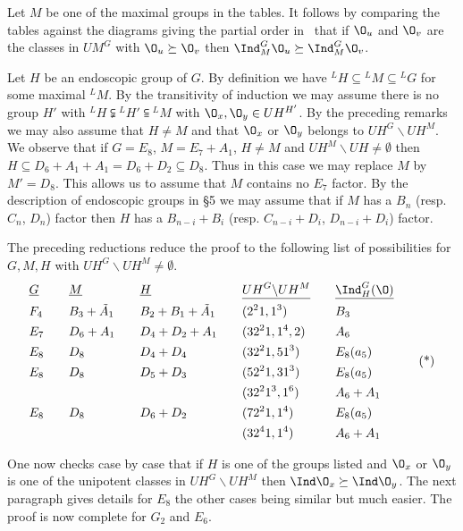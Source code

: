  Let $M$ be one of the maximal groups in the tables. 
It follows
by comparing the tables against the diagrams giving the partial
order 
in~\cite{Sp} that if $\O_u$ and $\O_v$ are the classes in $UM^G$
with
$\O_u \succeq \O_v$ then $\Ind_M^G \O_u \succeq \Ind_M^G \O_v$.

Let $H$ be an endoscopic group of $G$.  By definition we have
${}^L H \subseteq {}^L M \subseteq {}^L G$ for some maximal ${}^L
M$.  By
the transitivity of induction we may assume there is no group
$H'$ with
${}^L H \subsetneqq {}^L H' \subseteqq {}^L M$ with $\O_x, \O_y
\in UH^{H'}$.
By the preceding remarks we may also assume that $H \ne M$ and
that
$\O_x$ or $\O_y$ belongs to $UH^G \backslash UH^M$.  We observe
that if
$G = E_8$, $M = E_7 + A_1$, $H \ne M$ and $UH^M \backslash UH \ne
\emptyset$
then $H \subseteq D_6 + A_1 + A_1 = D_6 + D_2 \subseteq D_8$. 
Thus in this
case we may replace $M$ by $M' = D_8$.  This allows us to assume
that $M$
contains no $E_7$ factor.  By the description of endoscopic
groups in \S 5
we may assume that if $M$ has a $B_n$ (resp. $C_n$, $D_n$) factor
then $H$
has a $B_{n-i} + B_i$ (resp. $C_{n-i} + D_i$, $D_{n-i} + D_i$)
factor.

The preceding reductions reduce the proof to the following list
of
possibilities for $G, M, H$ with $UH^G \backslash UH^M \ne
\emptyset$.
     $$
     \alignedat 5
     &\underline{G} &\qquad &\underline{M} &\qquad
          &\underline{H} &\qquad &\underline{UH^G \backslash
UH^M} 
          &\qquad &\underline{\Ind_H^G (\O)}\\
     &F_4 &\qquad &B_3 + \tilde A_1 &\qquad &B_2 + B_1 + \tilde
A_1 
          &\qquad &(2^21, 1^3) &\qquad &B_3 \\
     &E_7 &\qquad &D_6 + A_1 &\qquad &D_4 + D_2 + A_1 &\qquad
&(32^21,1^4,2)
          &\qquad &A_6 \\
     &E_8 &\qquad &D_8 &\qquad &D_4 + D_4 &\qquad &(32^21,51^3)
          &\qquad &E_8(a_5) \\
     &E_8 &\qquad &D_8 &\qquad &D_5 + D_3 &\qquad &(52^21,31^3)
          &\qquad &E_8(a_5) \\
     &&&&&&&(32^21^3,1^6) &\qquad &A_6 + A_1 \\
     &E_8 &\qquad &D_8 &\qquad &D_6 + D_2 &\qquad &(72^21,1^4)
          &\qquad &E_8(a_5) \\
     &&&&&&&(32^41,1^4) &\qquad &A_6 + A_1
     \endalignedat
     \tag *
     $$

One now checks case by case that if $H$ is one of the groups
listed and
$\O_x$ or $\O_y$ is one of the unipotent classes in $UH^G
\backslash UH^M$
then $\Ind \O_x \succeq \Ind \O_y$.  The next paragraph gives
details for
$E_8$ the other cases being similar but much easier.  The proof
is now
complete for $G_2$ and $E_6$.

